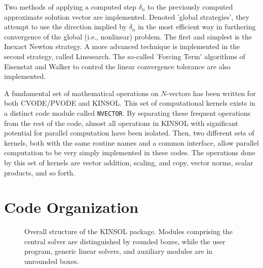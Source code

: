 Two methods of applying a computed step $\delta_n$ to the previously computed
approximate solution vector are implemented. Denoted 'global strategies',
they attempt to use the direction implied by $\delta_n$ in the most efficient 
way in furthering convergence of the global (i.e., nonlinear) problem. The 
first and simplest is the Inexact Newton strategy.  A more advanced technique 
is implemented in the second strategy, called Linesearch. The so-called 
'Forcing Term' algorithms of Eisenstat and Walker \cite{EiWa96} to control the 
linear convergence tolerance are also implemented. 

A fundamental set of mathematical operations on $N$-vectors has been written
for both CVODE/PVODE and KINSOL. This set of computational kernels exists in
a distinct code module called {\tt NVECTOR}. By separating these frequent 
operations from the rest of the code, almost all operations in KINSOL with 
significant potential for parallel computation have been isolated. Then, two
different sets of kernels, both with the same routine names and a common 
interface, allow parallel computation to be very simply implemented in these 
codes. The operations done by this set of kernels are vector addition, 
scaling, and copy, vector norms, scalar products, and so forth.

\section{Code Organization}

\begin{figure}[p]
\vspace{0.8in}
\caption{Overall structure of the KINSOL package.
  Modules comprising the central solver are distinguished by rounded
  boxes, while the user program, generic linear solvers, and auxiliary
  modules are in unrounded boxes.} 
\label{fig-kinorg}
\end{figure}

